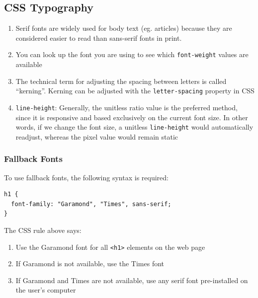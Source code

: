 \documentclass[a4paper, 12pt]{article}
\begin{document}
\subsection{CSS Typography}
\begin{enumerate}

\item Serif fonts are widely used for body text (eg. articles) because they are considered easier to read than sans-serif fonts in print.

\item You can look up the font you are using to see which \verb|font-weight| values are available

\item The technical term for adjusting the spacing between letters is called ``kerning''. Kerning can be adjusted with the \verb|letter-spacing| property in CSS

\item \verb|line-height|: Generally, the unitless ratio value is the preferred method, since it is responsive and based exclusively on the current font size. In other words, if we change the font size, a unitless \verb|line-height| would automatically readjust, whereas the pixel value would remain static

\end{enumerate}

\subsubsection{Fallback Fonts}
To use fallback fonts, the following syntax is required:
\begin{verbatim}
h1 {
  font-family: "Garamond", "Times", sans-serif;
}
\end{verbatim}
The CSS rule above says:
\begin{enumerate}
\item Use the Garamond font for all \verb|<h1>| elements on the web page

\item If Garamond is not available, use the Times font

\item If Garamond and Times are not available, use any serif font pre-installed on the user's computer

\end{enumerate}
\end{document}
